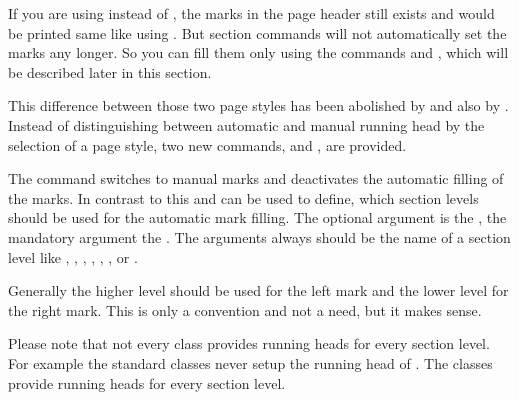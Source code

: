 {\begin{Explain}
      If you are using  instead of
      , the marks in the page
      header still exists and would be printed same like using
      . But section commands will not automatically set
      the marks any longer. So%
      you can fill them only using the commands
       and
      , which will be described
      later in this section.
    \end{Explain}\par
  }{%
  }%
  This difference between those two page styles has been abolished by
   and also by . Instead of distinguishing
  between automatic and manual running head by the selection of a page style,
  two new commands,  and , are provided.

  The command  switches to manual marks and deactivates the
  automatic filling of the marks. In contrast to this  and
   can be used to define, which section levels should be used
  for the automatic mark filling. The optional argument is the , the mandatory argument the . The arguments always should be the name of a section
  level like , , ,
  , , , or
  .

  Generally the higher level should be used for the left mark and the lower
  level for the right mark. This is only a convention and not a need, but it
  makes sense.

  Please note that not every class provides running heads
  for every section level. For example the standard classes never setup the
  running head of . The \KOMAScript{} classes
  provide running heads for every section level.

